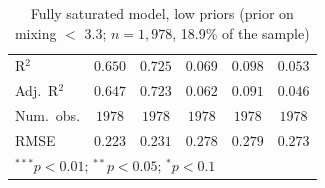 \begin{table}
\begin{center}
\begin{tabular}{l c c || c c || c}
\hline
R$^2$                                  & $0.650$        & $0.725$       & $0.069$        & $0.098$        & $0.053$       \\
Adj.\ R$^2$                            & $0.647$        & $0.723$       & $0.062$        & $0.091$        & $0.046$       \\
Num.\ obs.                             & $1978$         & $1978$        & $1978$         & $1978$         & $1978$        \\
RMSE                                   & $0.223$        & $0.231$       & $0.278$        & $0.279$        & $0.273$       \\
\hline
\multicolumn{6}{l}{\scriptsize{$^{***}p<0.01$; $^{**}p<0.05$; $^{*}p<0.1$}}
\end{tabular}
\caption{Fully saturated model, low priors (prior on mixing $<$ 3.3; $n = 1,978$, 18.9\% of the sample)}
\label{tab:saturated_low_priors}
\end{center}
\end{table}

